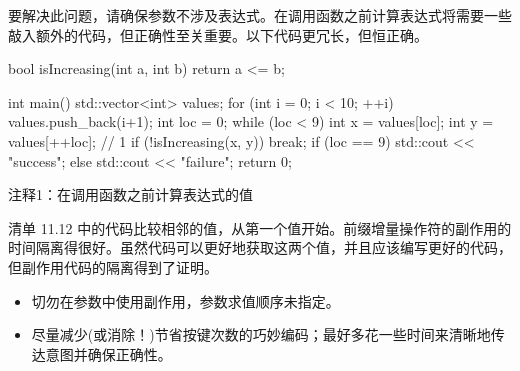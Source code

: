 要解决此问题，请确保参数不涉及表达式。在调用函数之前计算表达式将需要一些敲入额外的代码，但正确性至关重要。以下代码更冗长，但恒正确。


\begin{cpp}
bool isIncreasing(int a, int b) {
  return a <= b;
}

int main() {
  std::vector<int> values;
  for (int i = 0; i < 10; ++i)
    values.push_back(i+1);
  int loc = 0;
  while (loc < 9) {
    int x = values[loc];
    int y = values[++loc]; // 1
    if (!isIncreasing(x, y))
      break;
  }
  if (loc == 9)
    std::cout << "success\n";
  else
    std::cout << "failure\n";
  return 0;
}
\end{cpp}

{\footnotesize
注释1：在调用函数之前计算表达式的值
}

清单 11.12 中的代码比较相邻的值，从第一个值开始。前缀增量操作符的副作用的时间隔离得很好。虽然代码可以更好地获取这两个值，并且应该编写更好的代码，但副作用代码的隔离得到了证明。


\begin{itemize}
\item
切勿在参数中使用副作用，参数求值顺序未指定。

\item
尽量减少(或消除！)节省按键次数的巧妙编码；最好多花一些时间来清晰地传达意图并确保正确性。
\end{itemize}





